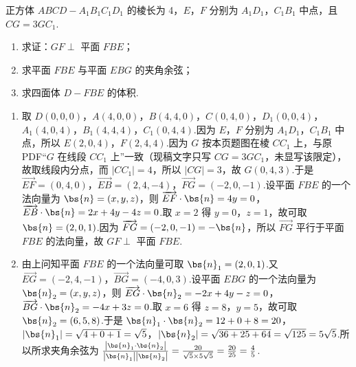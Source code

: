 \begin{problem}
正方体 \(ABCD-A_1B_1C_1D_1\) 的棱长为 4，\(E\)，\(F\) 分别为 \(A_1D_1\)，\(C_1B_1\) 中点，且 \(CG=3GC_1\).

\begin{enumerate}
\item 求证：\(GF\perp\) 平面 \(FBE\)；
\item 求平面 \(FBE\) 与平面 \(EBG\) 的夹角余弦；
\item 求四面体 \(D-FBE\) 的体积.
\end{enumerate}

\end{problem}

\begin{solution}
\begin{enumerate}
\item 取 \(D\left(0,0,0\right)\)，\(A\left(4,0,0\right)\)，\(B\left(4,4,0\right)\)，\(C\left(0,4,0\right)\)，\(D_1\left(0,0,4\right)\)，\(A_1\left(4,0,4\right)\)，\(B_1\left(4,4,4\right)\)，\(C_1\left(0,4,4\right)\).因为 \(E\)，\(F\) 分别为 \(A_1D_1\)，\(C_1B_1\) 中点，所以 \(E\left(2,0,4\right)\)，\(F\left(2,4,4\right)\).因为 \(G\) 按本页题图在棱 \(CC_1\) 上，与原PDF“\(G\) 在线段 \(CC_1\) 上”一致（现稿文字只写 \(CG=3GC_1\)，未显写该限定），故取线段内分点，而 \(\left|CC_1\right|=4\)，所以 \(\left|CG\right|=3\)，故 \(G\left(0,4,3\right)\).于是 \(\overrightarrow{EF}=\left(0,4,0\right)\)，\(\overrightarrow{EB}=\left(2,4,-4\right)\)，\(\overrightarrow{FG}=\left(-2,0,-1\right)\).设平面 \(FBE\) 的一个法向量为 \(\bs{n}=\left(x,y,z\right)\)，则 \(\overrightarrow{EF}\cdot\bs{n}=4y=0\)，\(\overrightarrow{EB}\cdot\bs{n}=2x+4y-4z=0\).取 \(x=2\) 得 \(y=0\)，\(z=1\)，故可取 \(\bs{n}=\left(2,0,1\right)\).因为 \(\overrightarrow{FG}=\left(-2,0,-1\right)=-\bs{n}\)，所以 \(\overrightarrow{FG}\) 平行于平面 \(FBE\) 的法向量，故 \(GF\perp\) 平面 \(FBE\).
\item 由上问知平面 \(FBE\) 的一个法向量可取 \(\bs{n}_1=\left(2,0,1\right)\).又 \(\overrightarrow{EG}=\left(-2,4,-1\right)\)，\(\overrightarrow{BG}=\left(-4,0,3\right)\).设平面 \(EBG\) 的一个法向量为 \(\bs{n}_2=\left(x,y,z\right)\)，则 \(\overrightarrow{EG}\cdot\bs{n}_2=-2x+4y-z=0\)，\(\overrightarrow{BG}\cdot\bs{n}_2=-4x+3z=0\).取 \(x=6\) 得 \(z=8\)，\(y=5\)，故可取 \(\bs{n}_2=\left(6,5,8\right)\).于是 \(\bs{n}_1\cdot\bs{n}_2=12+0+8=20\)，\(\left|\bs{n}_1\right|=\sqrt{4+0+1}=\sqrt5\)，\(\left|\bs{n}_2\right|=\sqrt{36+25+64}=\sqrt{125}=5\sqrt5\).所以所求夹角余弦为 \(\frac{\left|\bs{n}_1\cdot\bs{n}_2\right|}{\left|\bs{n}_1\right|\left|\bs{n}_2\right|}=\frac{20}{\sqrt5\times 5\sqrt5}=\frac{20}{25}=\frac45\).

\end{enumerate}
\end{solution}
